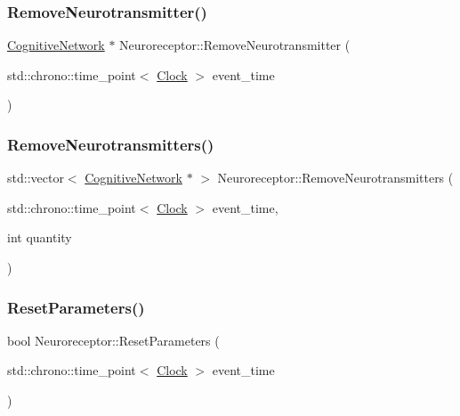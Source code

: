 \mbox{\label{classNeuroreceptor_a7e94ac827de7abbac585639edfd4f985}} 
\subsubsection{\texorpdfstring{Remove\+Neurotransmitter()}{RemoveNeurotransmitter()}}
{\footnotesize\ttfamily \mbox{\hyperlink{classCognitiveNetwork}{Cognitive\+Network}} $\ast$ Neuroreceptor\+::\+Remove\+Neurotransmitter (\begin{DoxyParamCaption}\item[{std\+::chrono\+::time\+\_\+point$<$ \mbox{\hyperlink{universe_8h_a0ef8d951d1ca5ab3cfaf7ab4c7a6fd80}{Clock}} $>$}]{event\+\_\+time }\end{DoxyParamCaption})}

\mbox{\label{classNeuroreceptor_ad760106ce6194ac02959c1882bd0f327}} 
\subsubsection{\texorpdfstring{Remove\+Neurotransmitters()}{RemoveNeurotransmitters()}}
{\footnotesize\ttfamily std\+::vector$<$ \mbox{\hyperlink{classCognitiveNetwork}{Cognitive\+Network}} $\ast$ $>$ Neuroreceptor\+::\+Remove\+Neurotransmitters (\begin{DoxyParamCaption}\item[{std\+::chrono\+::time\+\_\+point$<$ \mbox{\hyperlink{universe_8h_a0ef8d951d1ca5ab3cfaf7ab4c7a6fd80}{Clock}} $>$}]{event\+\_\+time,  }\item[{int}]{quantity }\end{DoxyParamCaption})}

\mbox{\label{classNeuroreceptor_a30debeb0311d92eb6abe354409c15d09}} 
\subsubsection{\texorpdfstring{Reset\+Parameters()}{ResetParameters()}}
{\footnotesize\ttfamily bool Neuroreceptor\+::\+Reset\+Parameters (\begin{DoxyParamCaption}\item[{std\+::chrono\+::time\+\_\+point$<$ \mbox{\hyperlink{universe_8h_a0ef8d951d1ca5ab3cfaf7ab4c7a6fd80}{Clock}} $>$}]{event\+\_\+time }\end{DoxyParamCaption})}

